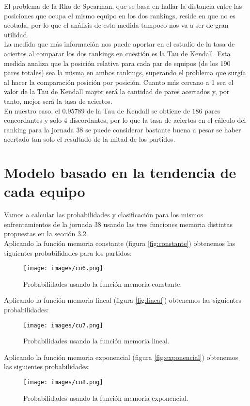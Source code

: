 El problema de la Rho de Spearman, que se basa en hallar la distancia entre las posiciones que ocupa el mismo equipo en los dos rankings, reside en que no es acotada, por lo que el análisis de esta medida tampoco nos va a ser de gran utilidad. \\

La medida que más información nos puede aportar en el estudio de la tasa de aciertos al comparar los dos rankings en cuestión es la Tau de Kendall. Esta medida analiza que la posición relativa para cada par de equipos (de los 190 pares totales) sea la misma en ambos rankings, superando el problema que surgía al hacer la comparación posición por posición. Cuanto más cercano a 1 sea el valor de la Tau de Kendall mayor será la cantidad de pares acertados y, por tanto, mejor será la tasa de aciertos. \\

En nuestro caso, el $0.95789$ de la Tau de Kendall se obtiene de $186$ pares concordantes y solo $4$ discordantes, por lo que la tasa de aciertos en el cálculo del ranking para la jornada 38 se puede considerar bastante buena a pesar se haber acertado tan solo el resultado de la mitad de los partidos.

\section{Modelo basado en la tendencia de cada equipo}
Vamos a calcular las probabilidades y clasificación para los mismos enfrentamientos de la jornada 38 usando las tres funciones memoria distintas propuestas en la sección 3.2.\\

Aplicando la función memoria constante (figura \ref{fig:constante}) obtenemos las siguientes probabilidades para los partidos:
\begin{figure}[H]
	\centering
	\texttt{[image: images/cu6.png]}
	\caption{Probabilidades usando la función memoria constante.}
\end{figure}

Aplicando la función memoria lineal (figura \ref{fig:lineal}) obtenemos las siguientes probabilidades:
\begin{figure}[H]
	\centering
	\texttt{[image: images/cu7.png]}
	\caption{Probabilidades usando la función memoria lineal.}
\end{figure}

Aplicando la función memoria exponencial (figura \ref{fig:exponencial}) obtenemos las siguientes probabilidades:
\begin{figure}[H]
	\centering
	\texttt{[image: images/cu8.png]}
	\caption{Probabilidades usando la función memoria exponencial.}
\end{figure}

